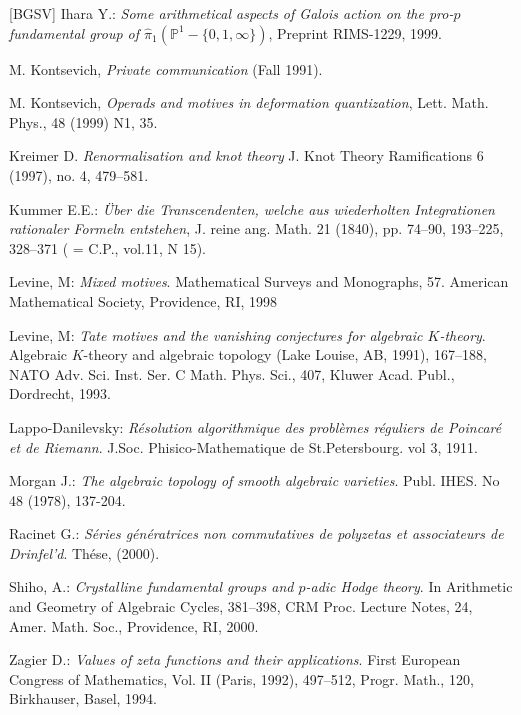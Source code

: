 \documentclass[10pt]{article}
\begin{document}
\begin{thebibliography}{[BGSV]}
 Ihara Y.: {\it Some arithmetical aspects of Galois 
action on the pro-$p$ fundamental group of 
$\widehat \pi_1({\mathbb P}^1 - \{0,1,\infty\})$}, Preprint RIMS-1229, 1999.

 M. Kontsevich, {\it Private communication} (Fall 1991). 

 M. Kontsevich, {\it Operads and motives in deformation quantization},
Lett. Math. Phys., 48 (1999) N1, 35.

 Kreimer D. {\it Renormalisation and knot theory} 
 J. Knot Theory Ramifications 6 (1997), no. 4, 479--581.

 Kummer E.E.: {\it \"Uber die Transcendenten, welche aus wiederholten Integrationen rationaler Formeln entstehen}, J. reine ang. Math. 21 (1840), pp. 74--90, 193--225, 328--371 ( = C.P., vol.11, N 15).

 Levine, M: {\it Mixed motives}. Mathematical Surveys and Monographs, 57. American Mathematical Society, Providence, RI, 1998

 Levine, M: {\it Tate motives and the vanishing conjectures for algebraic 
$K$-theory}. Algebraic $K$-theory and algebraic topology (Lake
Louise, AB, 1991), 167--188, NATO Adv. Sci. Inst. Ser. C Math. Phys. Sci., 407, 
Kluwer Acad. Publ., Dordrecht, 1993.

 Lappo-Danilevsky: {\it R\'esolution algorithmique des probl\`emes r\'eguliers de Poincar\'e et de Riemann}. J.Soc. Phisico-Mathematique de St.Petersbourg. vol 3, 1911.

 Morgan J.: {\it The algebraic topology of smooth algebraic varieties}. 
Publ. IHES. No 48 (1978), 137-204.

 Racinet G.: {\it S\'eries g\'en\'eratrices non commutatives de polyzetas et associateurs de Drinfel'd}. Th\'ese, (2000). 

 Shiho, A.: {\it Crystalline fundamental groups and $p$-adic Hodge theory}. 
In Arithmetic and Geometry of Algebraic Cycles, 
381--398, CRM Proc. Lecture Notes, 24, Amer. Math. Soc., Providence, RI, 2000. 

 Zagier D.: {\it Values of zeta functions and their applications}. First European Congress of Mathematics, Vol. II (Paris, 1992), 497--512, Progr.
Math., 120, Birkhauser, Basel, 1994. 


\end{thebibliography}
\end{document}
